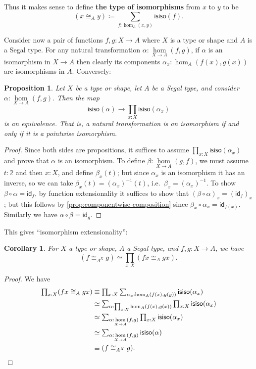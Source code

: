 \documentclass{amsart}
\theoremstyle{plain}
\newtheorem{cor}[thm]{Corollary}
\newtheorem{prop}[thm]{Proposition}
\theoremstyle{definition}
\theoremstyle{remark}
\numberwithin{equation}{section}
\newcommand{\tprod}{\textstyle\prod}
\newcommand{\tsum}{\textstyle\sum}
\newcommand{\jdeq}{\equiv}
\newcommand{\defeq}{\coloneqq}
\def\nat#1#2{\underset{#1\to#2}{\hom}}
\newcommand{\two}{\mathbb{2}}
\newcommand{\idarr}[1]{\mathsf{id}_{#1}}
\newcommand{\isiso}[1]{\mathsf{isiso}(#1)}
\begin{document}
Thus it makes sense to define \textbf{the type of isomorphisms} from $x$ to $y$ to be
\[ (x\cong_A y) \defeq \sum_{f:\hom_A(x,y)}\isiso f. \]

Consider now a pair of functions $f,g : X \to A$ where $X$ is a type or shape and $A$ is a Segal type. For any natural transformation $\alpha : \nat XA(f,g)$, if $\alpha$ is an isomorphism in $X \to A$ then clearly its components $\alpha_x : \hom_A(f(x),g(x))$ are isomorphisms in $A$. Conversely:

\begin{prop} Let $X$ be a type or shape, let $A$ be a Segal type, and consider $\alpha : \nat XA(f,g)$. Then the map
\[ \isiso \alpha \to \prod_{x : X} \isiso {\alpha_x}\] is an equivalence. That is, a natural transformation is an isomorphism if and only if it is a pointwise isomorphism. 
\end{prop}
\begin{proof}
  Since both sides are propositions, it suffices to assume $\prod_{x : X} \isiso {\alpha_x}$ and prove that $\alpha$ is an isomorphism.
  To define $\beta:\nat XA(g,f)$, we must assume $t:\two$ and then $x:X$, and define $\beta_x(t)$; but since $\alpha_x$ is an isomorphism it has an inverse, so we can take $\beta_x(t) = (\alpha_x)^{-1}(t)$, i.e.\ $\beta_x = (\alpha_x)^{-1}$.
  To show $\beta\circ\alpha = \idarr f$, by function extensionality it suffices to show that $(\beta \circ \alpha)_x = (\idarr f)_x$; but this follows by \cref{prop:componentwise-composition} since $\beta_x \circ \alpha_x = \idarr{f(x)}$.
  Similarly we have $\alpha\circ\beta = \idarr g$.
\end{proof}

This gives ``isomorphism extensionality'':

\begin{cor}\label{thm:isomorphism-extensionality}
  For $X$ a type or shape, $A$ a Segal type, and $f,g: X\to A$, we have
  \[ (f \cong_{A^X} g) \simeq \prod_{x :X} (fx \cong_A gx).\]
\end{cor}
\begin{proof}
  We have
  \begin{align*}
    \tprod_{x :X} (fx \cong_A gx)
    &\jdeq \tprod_{x :X} \sum_{\alpha_x:\hom_A(f(x),g(y))} \isiso {\alpha_x}\\
    &\simeq \tsum_{\alpha:\prod_{x:X}\hom_A(f(x),g(x))} \tprod_{x:X} \isiso {\alpha_x}\\
    &\simeq \tsum_{\alpha:\nat XA(f,g)} \tprod_{x:X} \isiso {\alpha_x}\\
    &\simeq  \tsum_{\alpha:\nat XA(f,g)} \isiso{\alpha}\\
    &\jdeq (f\cong_{A^X} g).\qedhere
  \end{align*}
\end{proof}
\end{document}
